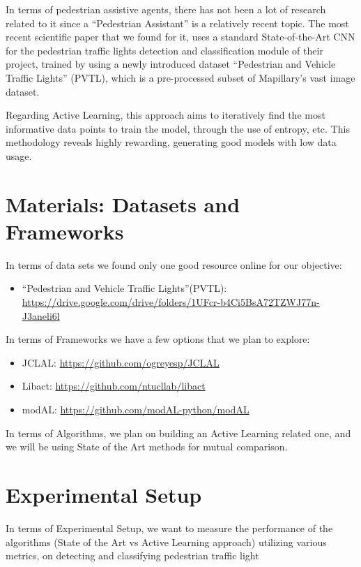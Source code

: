 \documentclass[journal, a4paper]{IEEEtran}
\begin{document}
In terms of pedestrian assistive agents, there has not been a lot of research 
related to it since a ``Pedestrian Assistant'' is a relatively recent topic. 
The most recent scientific paper that we found for it, uses a standard 
State-of-the-Art CNN for the pedestrian traffic lights detection and 
classification module of their project, trained by using a newly introduced 
dataset “Pedestrian and Vehicle Traffic Lights” (PVTL), which is a pre-processed 
subset of Mapillary’s vast image dataset.

Regarding Active Learning, this approach aims to iteratively find the most 
informative data points to train the model, through the use of entropy, etc. 
This methodology reveals highly rewarding, generating good models with low 
data usage.

\section{Materials: Datasets and Frameworks}

In terms of data sets we found only one good resource
online for our objective:
\begin{itemize}
  \item ``Pedestrian and Vehicle Traffic Lights''(PVTL): \url{https://drive.google.com/drive/folders/1UFcr-b4Ci5BsA72TZWJ77n-J3aneli6l}
\end{itemize}

In terms of Frameworks we have a few options that we
plan to explore:
\begin{itemize}
  \item  JCLAL: \url{https://github.com/ogreyesp/JCLAL}
  \item Libact: \url{https://github.com/ntucllab/libact}
  \item modAL: \url{https://github.com/modAL-python/modAL}
\end{itemize}

In terms of Algorithms, we plan on building an Active Learning related one, 
and we will be using State of the Art methods for mutual comparison.

\section{Experimental Setup}

In terms of Experimental Setup, we want to measure the performance of the 
algorithms (State of the Art vs Active Learning approach) utilizing various 
metrics, on detecting and classifying pedestrian traffic light
\end{document}

